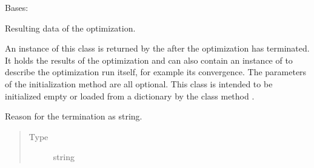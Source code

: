\documentclass[letterpaper,10pt,english]{sphinxmanual}
\begin{document}
\begin{fulllineitems}
\label{\detokenize{qsim:qsim.optimization_data.OptimizationResult}}
Bases: 

Resulting data of the optimization.

An instance of this class is returned by the  after the
optimization has terminated. It holds the results of the optimization and
can also contain an instance of  to describe the
optimization run itself, for example its convergence.
The parameters of the initialization method are all optional. This class is
intended to be initialized empty or loaded from a dictionary by the class
method {\hyperref[\detokenize{qsim:qsim.optimization_data.OptimizationResult.from_dict}]{}}.

\begin{fulllineitems}
\label{\detokenize{qsim:qsim.optimization_data.OptimizationResult.termination_reason}}
Reason for the termination as string.
\begin{quote}\begin{description}
\item[{Type}] \leavevmode
string

\end{description}\end{quote}


\end{fulllineitems}
\end{fulllineitems}
\end{document}
